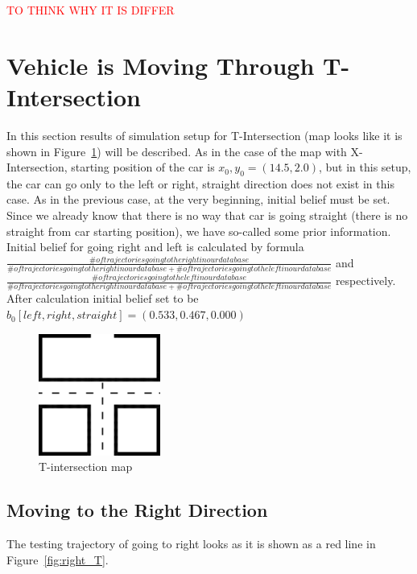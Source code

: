 \textcolor{red}{TO THINK WHY IT IS DIFFER}


\section{Vehicle is Moving Through T-Intersection}

In this section results of simulation setup for T-Intersection (map looks like it is shown in Figure~\ref{fig:Tint}) will be described. As in the case of the map with X-Intersection, starting position of the car is $x_0,y_0 = (14.5, 2.0)$, but in this setup, the car can go only to the left or right, straight direction does not exist in this case. As in the previous case, at the very beginning, initial belief must be set. Since we already know that there is no way that car is going straight (there is no straight from car starting position), we have so-called some prior information. Initial belief for going right and left is calculated by formula $\frac{\# of trajectories going to the right in our database}{\# of trajectories going to the right in our database + \# of trajectories going to the left in our database}$ and $\frac{\# of trajectories going to the left in our database}{\# of trajectories going to the right in our database + \# of trajectories going to the left in our database}$ respectively. After calculation initial belief set to be $b_0 [left, right, straight]= (0.533, 0.467, 0.000)$

\begin{figure}[H]
	\centering  	
	\includegraphics[width=4cm]{img/T-int.jpg}
	\caption{T-intersection map}
	\label{fig:Tint}    
\end{figure}

\subsection{Moving to the Right Direction}

The testing trajectory of going to right looks as it is shown as a red line in Figure~\ref{fig:right_T}.

